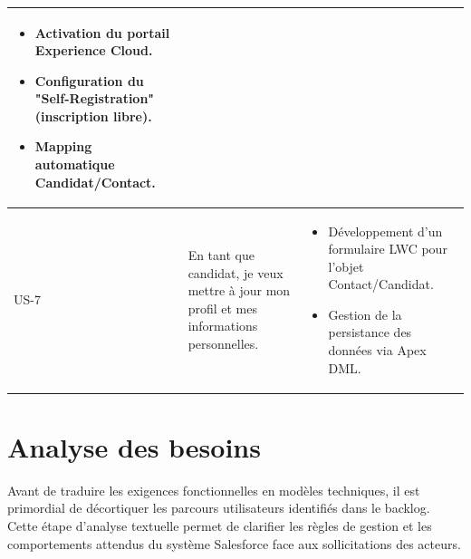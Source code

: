 \begin{table}[H]
\begin{tabular}{|p{1cm}|p{8cm}|p{8cm}|}
\begin{itemize}[leftmargin=*]
    \item Activation du portail Experience Cloud.
    \item Configuration du "Self-Registration" (inscription libre).
    \item Mapping automatique Candidat/Contact.
    \end{itemize} \\
    \hline
    US-7 & En tant que candidat, je veux mettre à jour mon profil et mes informations personnelles.& 
    \begin{itemize}[leftmargin=*]
    \item Développement d'un formulaire LWC pour l'objet Contact/Candidat.
    \item Gestion de la persistance des données via Apex DML.
    \end{itemize} \\
    \hline
    \end{tabular}
    \label{tab:user_stories_sprint1}
\end{table}

\section{Analyse des besoins}
Avant de traduire les exigences fonctionnelles en modèles techniques, il est primordial de décortiquer les parcours utilisateurs identifiés dans le backlog. Cette étape d'analyse textuelle permet de clarifier les règles de gestion et les comportements attendus du système Salesforce face aux sollicitations des acteurs.

